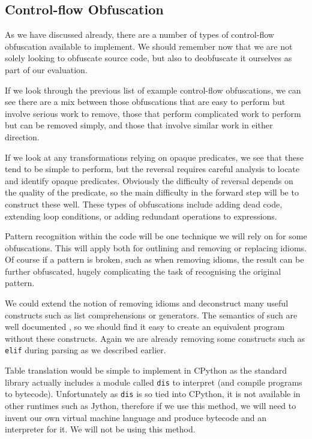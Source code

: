 \documentclass[twoside,a4paper]{report}
\begin{document}
\subsection{Control-flow Obfuscation}

As we have discussed already, there are a number of types of control-flow obfuscation available to implement. We should
remember now that we are not solely looking to obfuscate source code, but also to deobfuscate it ourselves as part of
our evaluation.

If we look through the previous list of example control-flow obfuscations, we can see there are a mix between those
obfuscations that are easy to perform but involve serious work to remove, those that perform complicated work to perform
but can be removed simply, and those that involve similar work in either direction.

If we look at any transformations relying on opaque predicates, we see that these tend to be simple to perform, but the
reversal requires careful analysis to locate and identify opaque predicates. Obviously the difficulty of reversal depends
on the quality of the predicate, so the main difficulty in the forward step will be to construct these well. These types
of obfuscations include adding dead code, extending loop conditions, or adding redundant operations to expressions.

Pattern recognition within the code will be one technique we will rely on for some obfuscations. This will apply both for
outlining and removing or replacing idioms. Of course if a pattern is broken, such as when removing idioms, the result can
be further obfuscated, hugely complicating the task of recognising the original pattern.

We could extend the notion of removing idioms and deconstruct many useful constructs such as list comprehensions or generators.
The semantics of such are well documented \cite{genexpr}, so we should find it easy to create an equivalent program without
these constructs. Again we are already removing some constructs such as \texttt{elif} during parsing as we described earlier.

Table translation would be simple to implement in CPython as the standard library actually includes a module called \texttt{dis}
to interpret (and compile programs to bytecode). Unfortunately as \texttt{dis} is so tied into CPython, it is not available in
other runtimes such as Jython, therefore if we use this method, we will need to invent our own virtual machine language and
produce bytecode and an interpreter for it. We will not be using this method. 
\end{document}
